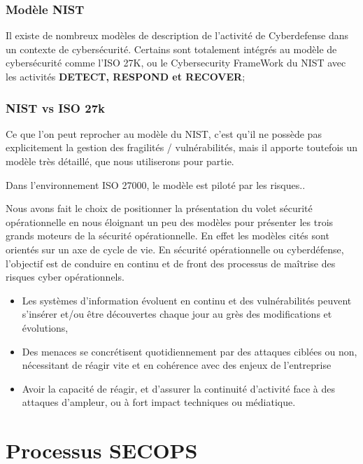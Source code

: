\begin{frame}
\frametitle<presentation>{Modèle NIST}

Il existe de nombreux modèles de description de l'activité de Cyberdefense dans un contexte de cybersécurité.
Certains sont totalement intégrés au modèle de cybersécurité comme l'ISO 27K, ou le Cybersecurity FrameWork du NIST  avec les activités \textbf{DETECT, RESPOND et RECOVER};
\end{frame}


\begin{frame}
\frametitle<presentation>{NIST vs ISO 27k}
Ce que l'on peut reprocher au modèle du NIST, c'est qu'il ne possède pas explicitement la gestion des fragilités / vulnérabilités, mais il apporte toutefois un modèle très détaillé, que nous utiliserons pour partie.
\end{frame}
Dans l'environnement ISO 27000, le modèle est piloté par les risques..

Nous avons fait le choix de positionner la présentation du volet sécurité opérationnelle en nous éloignant un peu des modèles pour présenter les trois grands moteurs de la sécurité opérationnelle. En effet les modèles cités sont orientés sur un axe de cycle de vie.
En sécurité opérationnelle ou cyberdéfense, l'objectif est de conduire en continu et de front des processus de maîtrise des risques cyber opérationnels.
\begin{itemize}
  \item Les systèmes d'information évoluent en continu et des vulnérabilités peuvent s'insérer et/ou être découvertes chaque jour au grès des modifications et évolutions,
  \item Des menaces se concrétisent quotidiennement par des attaques ciblées ou non, nécessitant de réagir vite et en cohérence avec des enjeux de l'entreprise
  \item Avoir la capacité de réagir, et d'assurer la continuité d'activité face à des attaques d'ampleur, ou à fort impact techniques ou médiatique.
\end{itemize}

\newpage
\section{Processus SECOPS}


